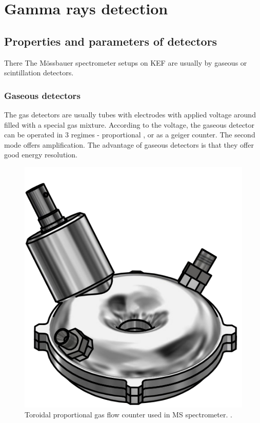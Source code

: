 
\chapter{Gamma rays detection}


\section{Properties and parameters of detectors}
There 
The Mössbauer spectrometer setups on KEF are usually by gaseous or scintillation detectors.


\subsection{Gaseous detectors}
The gas detectors are usually tubes with electrodes with applied voltage around filled with a special gas mixture. According to the voltage, the gaseous detector can be operated in 3 regimes - proportional , or as a geiger counter. The second mode offers amplification. The advantage of gaseous detectors is that they offer good energy resolution.

\begin{figure}[H]
 \centering
 \includegraphics[scale=0.55, angle = 0]{./pictures/GASdet.png}
 \caption{Toroidal proportional gas flow counter used in MS spectrometer. \cite{Optimized}.}
 \label{toroid}
 
\end{figure}



